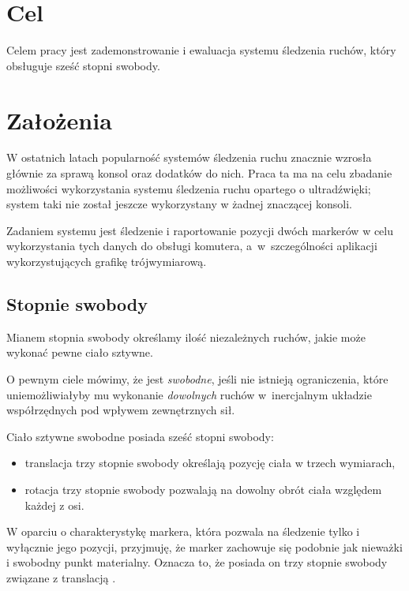 \label{ch:cele}
\section{Cel}
Celem pracy jest zademonstrowanie i ewaluacja systemu śledzenia ruchów, który obsługuje sześć stopni swobody.

\section{Założenia}
W ostatnich latach popularność systemów śledzenia ruchu znacznie wzrosła głównie za sprawą konsol oraz dodatków do nich. Praca ta ma na celu zbadanie możliwości wykorzystania systemu śledzenia ruchu opartego o ultradźwięki; system taki nie został jeszcze wykorzystany w żadnej znaczącej konsoli.

Zadaniem systemu jest śledzenie i raportowanie pozycji dwóch markerów w celu wykorzystania tych danych do obsługi komutera, a~w~szczególności aplikacji wykorzystujących grafikę trójwymiarową.

\subsection{Stopnie swobody}
Mianem stopnia swobody określamy ilość niezależnych ruchów, jakie może wykonać pewne ciało sztywne.

O pewnym ciele mówimy, że jest \textsl{swobodne}, jeśli nie istnieją ograniczenia, które uniemożliwiałyby mu wykonanie \textsl{dowolnych} ruchów w~inercjalnym układzie współrzędnych pod wpływem zewnętrznych sił.

Ciało sztywne swobodne posiada sześć stopni swobody:
\begin{itemize}
 \item translacja \ppauza trzy stopnie swobody określają pozycję ciała w trzech wymiarach,
 \item rotacja \ppauza trzy stopnie swobody pozwalają na dowolny obrót ciała względem każdej z osi.
\end{itemize}

W oparciu o charakterystykę markera, która pozwala na śledzenie tylko i wyłącznie jego pozycji, przyjmuję, że marker zachowuje się podobnie jak nieważki i swobodny punkt materialny. Oznacza to, że posiada on trzy stopnie swobody związane z translacją \citep{WrZa76}.

